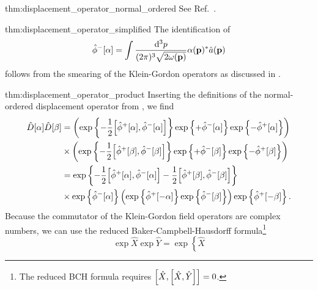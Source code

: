 \begin{delayedproof}{thm:displacement_operator_normal_ordered}
	See Ref.~\cite[p.~48]{Barnett2002}.
\end{delayedproof}
\begin{delayedproof}{thm:displacement_operator_simplified}
	The identification of
	\begin{equation*}
		\hat\phi^-[\alpha]
		=
		\int\frac{\dd[3]{p}}{(2\pi)^3\sqrt{2\omega(\vb{p})}}
		\alpha(\vb{p})^*
		\hat{a}(\vb{p})
	\end{equation*}
	follows from the smearing of the Klein-Gordon operators as discussed in .
\end{delayedproof}
\begin{delayedproof}{thm:displacement_operator_product}
	Inserting the definitions of the normal-ordered displacement operator from , we find
	\begin{equation*}
		\begin{split}
			\hat{D}[\alpha]
			\hat{D}[\beta]
			&=
			\left(
				\exp\left\{
					-
					\frac{1}{2}
					\comm{\hat\phi^+[\alpha]}{\hat\phi^-[\alpha]}
				\right\}
				\exp\left\{
					+\hat\phi^-[\alpha]
				\right\}
				\exp\left\{
					-\hat\phi^+[\alpha]
				\right\}
			\right)
			\\
			&\times
			\left(
				\exp\left\{
					-
					\frac{1}{2}
					\comm{\hat\phi^+[\beta]}{\hat\phi^-[\beta]}
				\right\}
				\exp\left\{
					+\hat\phi^-[\beta]
				\right\}
				\exp\left\{
					-\hat\phi^+[\beta]
				\right\}
			\right)
			\\
			&=
			\exp\left\{
				-
				\frac{1}{2}
				\comm{\hat\phi^+[\alpha]}{\hat\phi^-[\alpha]}
				-
				\frac{1}{2}
				\comm{\hat\phi^+[\beta]}{\hat\phi^-[\beta]}
			\right\}
			\\
			&\times
			\exp\left\{
				\hat\phi^-[\alpha]
			\right\}
			\left(
				\exp\left\{
					\hat\phi^+[-\alpha]
				\right\}
				\exp\left\{
					\hat\phi^-[\beta]
				\right\}
			\right)
			\exp\left\{
				\hat\phi^+[-\beta]
			\right\}
			.
		\end{split}
	\end{equation*}
	Because the commutator of the Klein-Gordon field operators are complex numbers, we can use the reduced Baker-Campbell-Hausdorff formula\footnote{The reduced BCH formula requires $\comm{\hat{X}}{\comm{\hat{X}}{\hat{Y}}}=0$.}
	\begin{equation*}
		\exp\hat{X}
		\exp\hat{Y}
		=
		\exp\left\{
			\hat{X}

\end{equation*}
\end{delayedproof}

